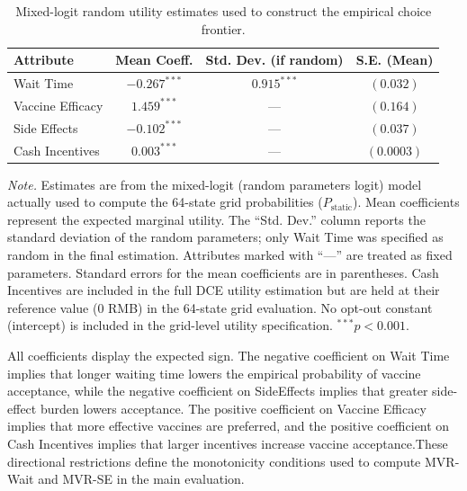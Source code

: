 \documentclass[11pt]{article}
\begin{document}
\begin{table}[h]
\centering
\caption{Mixed-logit random utility estimates used to construct the empirical choice frontier.}
\label{tab:static_frontier_estimates}
\small
\setlength{\tabcolsep}{8pt} %
\begin{tabular}{l c c c}
\toprule
\textbf{Attribute} & \textbf{Mean Coeff.} & \textbf{Std. Dev. (if random)} & \textbf{S.E. (Mean)} \\
\midrule
Wait Time & $-0.267^{***}$ & $0.915^{***}$ & $(0.032)$ \\
Vaccine Efficacy & $1.459^{***}$ & --- & $(0.164)$ \\
Side Effects & $-0.102^{***}$ & --- & $(0.037)$ \\
Cash Incentives & $0.003^{***}$ & --- & $(0.0003)$ \\
\bottomrule
\end{tabular}

\vspace{0.4em}
\begin{minipage}{0.95\textwidth}
\small
\textit{Note.} Estimates are from the mixed-logit (random parameters logit) model actually used to compute the 64-state grid probabilities ($P_{\mathrm{static}}$). Mean coefficients represent the expected marginal utility. The ``Std. Dev.'' column reports the standard deviation of the random parameters; only Wait Time was specified as random in the final estimation. Attributes marked with ``---'' are treated as fixed parameters. Standard errors for the mean coefficients are in parentheses. Cash Incentives are included in the full DCE utility estimation but are held at their reference value (0 RMB) in the 64-state grid evaluation. No opt-out constant (intercept) is included in the grid-level utility specification. $^{***}p < 0.001$.
\end{minipage}
\end{table}

All coefficients display the expected sign. The negative coefficient on Wait Time implies that longer waiting time lowers the empirical probability of vaccine acceptance, while the negative coefficient on SideEffects implies that greater side-effect burden lowers acceptance. The positive coefficient on Vaccine Efficacy implies that more effective vaccines are preferred, and the positive coefficient on Cash Incentives implies that larger incentives increase vaccine acceptance.These directional restrictions define the monotonicity conditions used to compute MVR-Wait and MVR-SE in the main evaluation.
\end{document}
